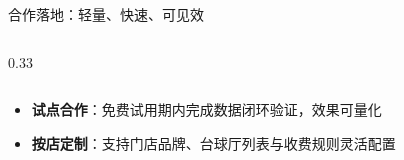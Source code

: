 \documentclass[aspectratio=169,11pt]{ctexbeamer}
\begin{document}
\begin{frame}{合作落地：轻量、快速、可见效}
\begin{columns}[T]
\begin{column}{0.33\textwidth}
    \end{column}

  \end{columns}

  \vspace{1.1em}

  \begin{itemize}

    \setlength{\itemsep}{0.4em}

    \item \textbf{试点合作}：免费试用期内完成数据闭环验证，效果可量化

    \item \textbf{按店定制}：支持门店品牌、台球厅列表与收费规则灵活配置

  \end{itemize}

\end{frame}



\end{document}
